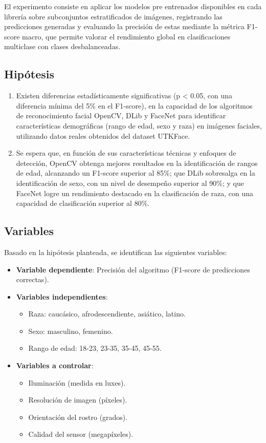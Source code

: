 El experimento consiste en aplicar los modelos pre entrenados disponibles en cada librería sobre subconjuntos estratificados de imágenes, registrando las predicciones generadas y evaluando la precisión de estas mediante la métrica F1-score macro, que permite valorar el rendimiento global en clasificaciones multiclase con clases desbalanceadas.

\subsection{Hipótesis}
\begin{enumerate}
  \item Existen diferencias estadísticamente significativas (p < 0.05, con una diferencia mínima del 5\% en el F1-score), en la capacidad de los algoritmos de reconocimiento facial OpenCV, DLib y FaceNet para identificar características demográficas (rango de edad, sexo y raza) en imágenes faciales, utilizando datos reales obtenidos del dataset UTKFace.

  \item Se espera que, en función de sus características técnicas y enfoques de detección, OpenCV obtenga mejores resultados en la identificación de rangos de edad, alcanzando un F1-score superior al 85\%; que DLib sobresalga en la identificación de sexo, con un nivel de desempeño superior al 90\%; y que FaceNet logre un rendimiento destacado en la clasificación de raza, con una capacidad de clasificación superior al 80\%.
\end{enumerate}

\subsection{Variables}
Basado en la hipótesis planteada, se identifican las siguientes variables:

\begin{itemize}
  \item \textbf{Variable dependiente}: Precisión del algoritmo (F1-score de predicciones correctas).
  \item \textbf{Variables independientes}:
        \begin{itemize}
          \item Raza: caucásico, afrodescendiente, asiático, latino.
          \item Sexo: masculino, femenino.
          \item Rango de edad: 18-23, 23-35, 35-45, 45-55.
        \end{itemize}
  \item \textbf{Variables a controlar}:
        \begin{itemize}
          \item Iluminación (medida en luxes).
          \item Resolución de imagen (píxeles).
          \item Orientación del rostro (grados).
          \item Calidad del sensor (megapíxeles).
        \end{itemize}
\end{itemize}


